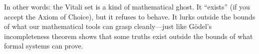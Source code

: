 In other words: the Vitali set is a kind of mathematical ghost. It “exists” (if you accept the Axiom of Choice), but it refuses to behave. It lurks outside the bounds of what our mathematical tools can grasp cleanly—just like Gödel’s incompleteness theorem shows that some truths exist outside the bounds of what formal systems can prove.






